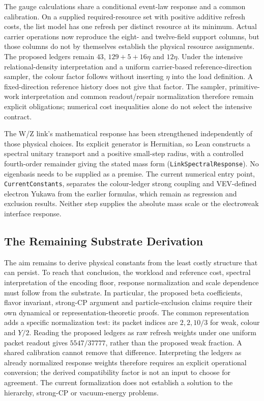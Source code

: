 The gauge calculations share a conditional event-law response and a common calibration. On a supplied required-resource set with positive additive refresh costs, the list model has one refresh per distinct resource at its minimum. Actual carrier operations now reproduce the eight- and twelve-field support columns, but those columns do not by themselves establish the physical resource assignments. The proposed ledgers remain $43$, $129+5+16\eta$ and $12\eta$. Under the intensive relational-density interpretation and a uniform carrier-based reference-direction sampler, the colour factor follows without inserting $\eta$ into the load definition. A fixed-direction reference history does not give that factor. The sampler, primitive-work interpretation and common readout/repair normalization therefore remain explicit obligations; numerical cost inequalities alone do not select the intensive contract.

The W/Z link's mathematical response has been strengthened independently of those physical choices. Its explicit generator is Hermitian, so Lean constructs a spectral unitary transport and a positive small-step radius, with a controlled fourth-order remainder giving the stated mass form (\texttt{LinkSpectralResponse}). No eigenbasis needs to be supplied as a premise. The current numerical entry point, \texttt{CurrentConstants}, separates the colour-ledger strong coupling and VEV-defined electron Yukawa from the earlier formulas, which remain as regression and exclusion results. Neither step supplies the absolute mass scale or the electroweak interface response.

\subsection{The Remaining Substrate Derivation}
The aim remains to derive physical constants from the least costly structure that can persist. To reach that conclusion, the workload and reference cost, spectral interpretation of the encoding floor, response normalization and scale dependence must follow from the substrate. In particular, the proposed beta coefficients, flavor invariant, strong-CP argument and particle-exclusion claims require their own dynamical or representation-theoretic proofs. The common representation adds a specific normalization test: its packet indices are $2,2,10/3$ for weak, colour and $Y/2$. Reading the proposed ledgers as raw refresh weights under one uniform packet readout gives $5547/37777$, rather than the proposed weak fraction. A shared calibration cannot remove that difference. Interpreting the ledgers as already normalized response weights therefore requires an explicit operational conversion; the derived compatibility factor is not an input to choose for agreement. The current formalization does not establish a solution to the hierarchy, strong-CP or vacuum-energy problems.

